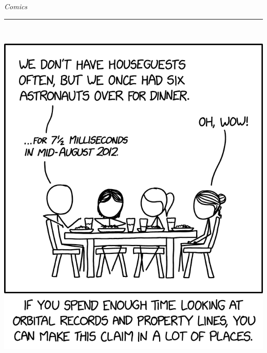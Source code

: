 \documentclass{article}
\renewcommand\headline[1]{\begin{center} {\huge \textsl{ #1}}\\ %
			\rule[5pt]{0.8\hsize}{0.5pt}\\ \end{center}}
\begin{document}
\begin{multicols}{3}
\headline{Comics}
\center\includegraphics[width=\linewidth]{images/comic.png}


\end{multicols}
\end{document}

